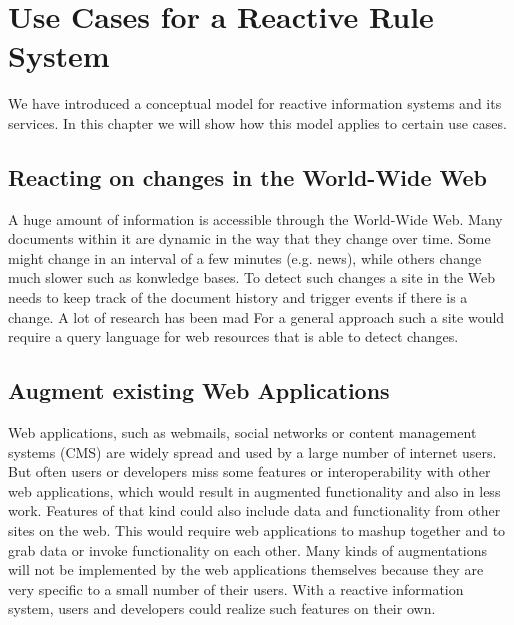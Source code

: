 \chapter{Use Cases for a Reactive Rule System}
We have introduced a conceptual model for reactive information systems and its services.
In this chapter we will show how this model applies to certain use cases.

\section{Reacting on changes in the World-Wide Web}
A huge amount of information is accessible through the World-Wide Web.
Many documents within it are dynamic in the way that they change over time.
Some might change in an interval of a few minutes (e.g. news), while others change much slower such as konwledge bases.
To detect such changes a site in the Web needs to keep track of the document history and trigger events if there is a change.
A lot of research has been mad
For a general approach such a site would require a query language for web resources that is able to detect changes.


\section{Augment existing Web Applications}
Web applications, such as webmails, social networks or content management systems (\textrm{CMS}) are widely spread and used by a large number of internet users.
But often users or developers miss some features or interoperability with other web applications, which would result in augmented functionality and also in less work.
Features of that kind could also include data and functionality from other sites on the web.
This would require web applications to mashup together and to grab data or invoke functionality on each other.
Many kinds of augmentations will not be implemented by the web applications themselves because they are very specific to a small number of their users.
With a reactive information system, users and developers could realize such features on their own.



